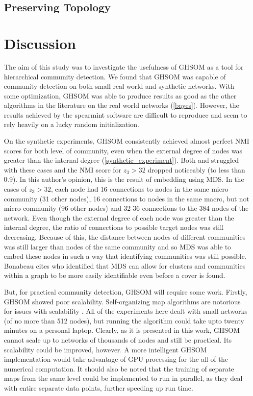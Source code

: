 \documentclass{article}
\begin{document}
\subsection{Preserving Topology}

\section{Discussion}
The aim of this study was to investigate the usefulness of GHSOM as a tool for hierarchical community detection. 
We found that GHSOM was capable of community detection on both small real world and synthetic networks. 
With some optimization, GHSOM was able to produce results as good as the other algorithms in the literature on the real world networks (\cref{bayes}). However, the results achieved by the spearmint software are difficult to reproduce and seem to rely heavily on a lucky random initialization.

On the synthetic experiments, GHSOM consistently achieved almost perfect NMI scores for both level of community, even when the external degree of nodes was greater than the internal degree (\cref{synthetic_experiment}).
Both \cite{lancichinetti2009detecting} and \cite{yang2013hierarchical} struggled with these cases and the NMI score for $z_3 > 32$ dropped noticeably (to less than 0.9).
In this author's opinion, this is the result of embedding using MDS. In the cases of $z_3 > 32$, each node had 16 connections to nodes in the same micro community (31 other nodes), 16 connections to nodes in the same macro, but not micro community (96 other nodes) and 32-36 connections to the 384 nodes of the network. 
Even though the external degree of each node was greater than the internal degree, the ratio of connections to possible target nodes was still decreasing.
Because of this, the distance between nodes of different communities was still larger than nodes of the same community and so MDS was able to embed these nodes in such a way that identifying communities was still possible. 
Bonabeau \cite{bonabeau2002graph} cites \cite{kernighan1970efficient} who identified that MDS can allow for clusters and communities within a graph to be more easily identifiable even before a cover is found. 

But, for practical community detection, GHSOM will require some work. 
Firstly, GHSOM showed poor scalability. Self-organizing map algorithms are notorious for issues with scalability \cite{smith2002applications}.
All of the experiments here dealt with small networks (of no more than 512 nodes), but running the algorithm could take upto twenty minutes on a personal laptop.
Clearly, as it is presented in this work, GHSOM cannot scale up to networks of thousands of nodes and still be practical.
Its scalability could be improved, however.
A more intelligent GHSOM implementation would take advantage of GPU processing for the all of the numerical computation.
It should also be noted that the training of separate maps from the same level could be implemented to run in parallel, as they deal with entire separate data points, further speeding up run time.
\end{document}
